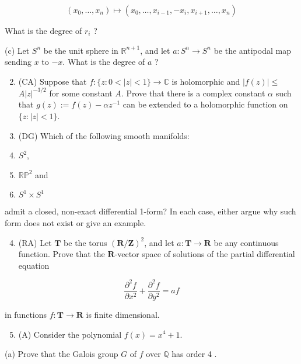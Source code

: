 \documentclass[10pt]{article}
\begin{document}
$$
\left(x_{0}, \ldots, x_{n}\right) \mapsto\left(x_{0}, \ldots, x_{i-1},-x_{i}, x_{i+1}, \ldots, x_{n}\right)
$$

What is the degree of $r_{i}$ ?

(c) Let $S^{n}$ be the unit sphere in $\mathbb{R}^{n+1}$, and let $a: S^{n} \rightarrow S^{n}$ be the antipodal map sending $x$ to $-x$. What is the degree of $a$ ?

\begin{enumerate}
  \setcounter{enumi}{1}
  \item (CA) Suppose that $f:\{z: 0<|z|<1\} \rightarrow \mathbb{C}$ is holomorphic and $|f(z)| \leq$ $A|z|^{-3 / 2}$ for some constant $A$. Prove that there is a complex constant $\alpha$ such that $g(z):=f(z)-\alpha z^{-1}$ can be extended to a holomorphic function on $\{z:|z|<1\}$.

  \item (DG) Which of the following smooth manifolds:

  \item $S^{2}$,

  \item $\mathbb{R P}^{2}$ and

  \item $S^{1} \times S^{1}$

\end{enumerate}

admit a closed, non-exact differential 1-form? In each case, either argue why such form does not exist or give an example.

\begin{enumerate}
  \setcounter{enumi}{3}
  \item (RA) Let $\mathbf{T}$ be the torus $(\mathbf{R} / \mathbf{Z})^{2}$, and let $a: \mathbf{T} \rightarrow \mathbf{R}$ be any continuous function. Prove that the $\mathbf{R}$-vector space of solutions of the partial differential equation
\end{enumerate}

$$
\frac{\partial^{2} f}{\partial x^{2}}+\frac{\partial^{2} f}{\partial y^{2}}=a f
$$

in functions $f: \mathbf{T} \rightarrow \mathbf{R}$ is finite dimensional.

\begin{enumerate}
  \setcounter{enumi}{4}
  \item (A) Consider the polynomial $f(x)=x^{4}+1$.
\end{enumerate}

(a) Prove that the Galois group $G$ of $f$ over $\mathbb{Q}$ has order 4 .
\end{document}
